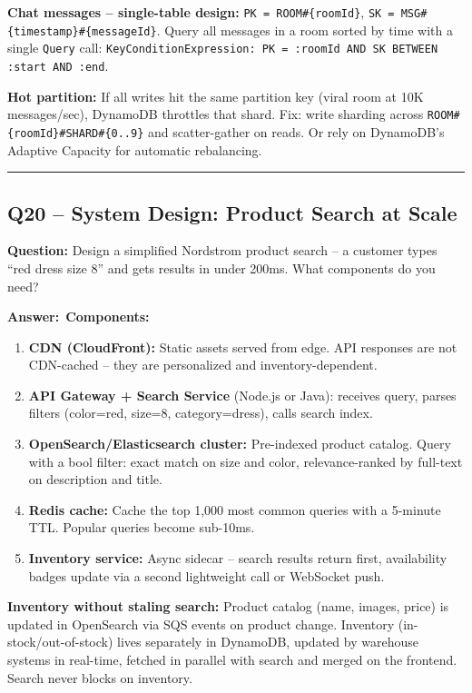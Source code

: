 \documentclass[letterpaper,10pt]{article}
\newlength{\boxwidth}
\newcommand{\questionbox}[1]{%
  \vspace{6pt}%
  \noindent\colorbox{qbg}{%
    \begin{minipage}{\boxwidth}%
      \vspace{3pt}\textbf{\textcolor{nordblue}{Question:}} #1\vspace{3pt}%
    \end{minipage}%
  }\vspace{2pt}%
}
\newcommand{\answerlabel}{\noindent\textbf{\textcolor{answerblue}{Answer:}}~}
\begin{document}
\textbf{Chat messages -- single-table design:} \texttt{PK = ROOM\#\{roomId\}}, \texttt{SK = MSG\#\{timestamp\}\#\{messageId\}}. Query all messages in a room sorted by time with a single \texttt{Query} call: \texttt{KeyConditionExpression: PK = :roomId AND SK BETWEEN :start AND :end}.

\textbf{Hot partition:} If all writes hit the same partition key (viral room at 10K messages/sec), DynamoDB throttles that shard. Fix: write sharding across \texttt{ROOM\#\{roomId\}\#SHARD\#\{0..9\}} and scatter-gather on reads. Or rely on DynamoDB's Adaptive Capacity for automatic rebalancing.

\medskip\rule{\linewidth}{0.2pt}

\subsection*{Q20 -- System Design: Product Search at Scale}

\questionbox{Design a simplified Nordstrom product search -- a customer types ``red dress size 8'' and gets results in under 200ms. What components do you need?}

\answerlabel \textbf{Components:}
\begin{enumerate}[leftmargin=*, itemsep=0pt]
  \item \textbf{CDN (CloudFront):} Static assets served from edge. API responses are not CDN-cached -- they are personalized and inventory-dependent.
  \item \textbf{API Gateway + Search Service} (Node.js or Java): receives query, parses filters (color=red, size=8, category=dress), calls search index.
  \item \textbf{OpenSearch/Elasticsearch cluster:} Pre-indexed product catalog. Query with a bool filter: exact match on size and color, relevance-ranked by full-text on description and title.
  \item \textbf{Redis cache:} Cache the top 1,000 most common queries with a 5-minute TTL. Popular queries become sub-10ms.
  \item \textbf{Inventory service:} Async sidecar -- search results return first, availability badges update via a second lightweight call or WebSocket push.
\end{enumerate}

\textbf{Inventory without staling search:} Product catalog (name, images, price) is updated in OpenSearch via SQS events on product change. Inventory (in-stock/out-of-stock) lives separately in DynamoDB, updated by warehouse systems in real-time, fetched in parallel with search and merged on the frontend. Search never blocks on inventory.
\end{document}
